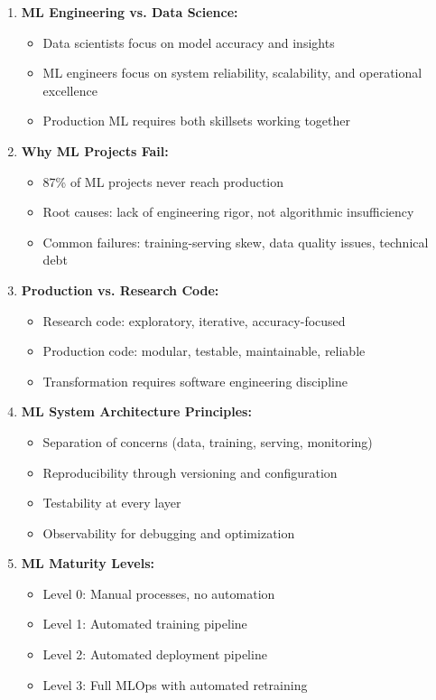 \begin{enumerate}
    \item \textbf{ML Engineering vs. Data Science:}
    \begin{itemize}
        \item Data scientists focus on model accuracy and insights
        \item ML engineers focus on system reliability, scalability, and operational excellence
        \item Production ML requires both skillsets working together
    \end{itemize}

    \item \textbf{Why ML Projects Fail:}
    \begin{itemize}
        \item 87\% of ML projects never reach production \citep{venturebeat2019}
        \item Root causes: lack of engineering rigor, not algorithmic insufficiency
        \item Common failures: training-serving skew, data quality issues, technical debt
    \end{itemize}

    \item \textbf{Production vs. Research Code:}
    \begin{itemize}
        \item Research code: exploratory, iterative, accuracy-focused
        \item Production code: modular, testable, maintainable, reliable
        \item Transformation requires software engineering discipline
    \end{itemize}

    \item \textbf{ML System Architecture Principles:}
    \begin{itemize}
        \item Separation of concerns (data, training, serving, monitoring)
        \item Reproducibility through versioning and configuration
        \item Testability at every layer
        \item Observability for debugging and optimization
    \end{itemize}

    \item \textbf{ML Maturity Levels:}
    \begin{itemize}
        \item Level 0: Manual processes, no automation
        \item Level 1: Automated training pipeline
        \item Level 2: Automated deployment pipeline
        \item Level 3: Full MLOps with automated retraining
    \end{itemize}
\end{enumerate}

